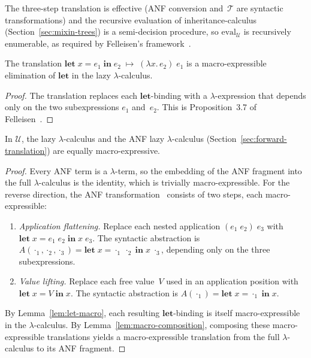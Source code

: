 The three-step translation is effective (ANF conversion
and~$\mathcal{T}$ are syntactic transformations) and the
recursive evaluation of inheritance-calculus
(Section~\ref{sec:mixin-trees}) is a semi-decision
procedure, so $\mathrm{eval}_{\mathscr{U}}$ is
recursively enumerable, as required by
Felleisen's framework~\cite{felleisen1991-expressive-power}.

\begin{lemma}
  \label{lem:let-macro}
  The translation
  $\mathbf{let}\; x = e_1 \;\mathbf{in}\; e_2
  \;\mapsto\; (\lambda x.\, e_2)\; e_1$
  is a macro-expressible elimination of $\mathbf{let}$
  in the lazy $\lambda$-calculus.
\end{lemma}

\begin{proof}
  The translation replaces each $\mathbf{let}$-binding
  with a $\lambda$-expression that depends only on the
  two subexpressions $e_1$ and~$e_2$.
  This is Proposition~3.7 of
  Felleisen~\cite{felleisen1991-expressive-power}.
\end{proof}

\begin{lemma}
  \label{lem:anf-equiv}
  In $\mathscr{U}$, the lazy $\lambda$-calculus and the
  ANF lazy $\lambda$-calculus
  (Section~\ref{sec:forward-translation}) are equally
  macro-expressive.
\end{lemma}

\begin{proof}
  Every ANF term is a $\lambda$-term, so the embedding
  of the ANF fragment into the full $\lambda$-calculus is
  the identity, which is trivially macro-expressible.
  For the reverse direction, the ANF
  transformation~\cite{flanagan1993-essence-compiling-continuations} consists of
  two steps, each macro-expressible:
  \begin{enumerate}
    \item \emph{Application flattening.}
      Replace each nested application
      $(e_1\; e_2)\; e_3$ with
      $\mathbf{let}\; x = e_1\; e_2 \;\mathbf{in}\;
      x\; e_3$.
      The syntactic abstraction is
      $A(\cdot_1, \cdot_2, \cdot_3)
      = \mathbf{let}\; x = \cdot_1\; \cdot_2
      \;\mathbf{in}\; x\; \cdot_3$,
      depending only on the three subexpressions.
    \item \emph{Value lifting.}
      Replace each free value~$V$ used in an application
      position with
      $\mathbf{let}\; x = V \;\mathbf{in}\; x$.
      The syntactic abstraction is
      $A(\cdot_1) = \mathbf{let}\; x = \cdot_1
      \;\mathbf{in}\; x$.
  \end{enumerate}
  By Lemma~\ref{lem:let-macro}, each resulting
  $\mathbf{let}$-binding is itself
  macro-expressible in the $\lambda$-calculus.
  By Lemma~\ref{lem:macro-composition}, composing
  these macro-expressible translations
  yields a macro-expressible translation from the full
  $\lambda$-calculus to its ANF fragment.
\end{proof}

